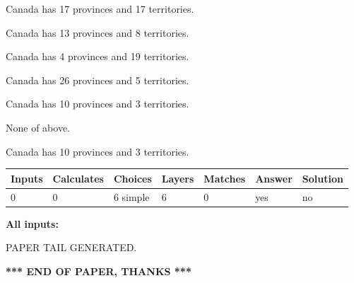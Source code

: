 \documentclass[12pt]{article}
\begin{document}
 
Canada has  17 provinces and  17 territories.
 
 
Canada has  13 provinces and  8 territories.
 
 
Canada has   4 provinces and  19 territories.
 
 
Canada has  26 provinces and  5 territories.
 
 
Canada has 10  provinces and 3 territories.
 
 
 None of above.
 
 
\noindent{}
 
 
Canada has 10  provinces and 3 territories.
 
 
\noindent{}
 
 
   
   
   
   
\noindent\begin{tabular}{|l|l|l|l|l|l|l|}
 \hline
Inputs & Calculates & Choices & Layers & Matches & Answer & Solution \\ \hline
 0  & 
 0  & 
 6
  simple  
  & 
 6  & 
 0  & 
  yes & 
  no 
  \\ \hline
 \end{tabular}
   
   
   
   
\noindent{}
   
   
   
   
\noindent\vspace{0.1in}\hspace{-0.08in} {\textbf{\Large{All inputs: }}}
   
   
   
   
   
   
 \vspace{0.2in}
 
   
   
\vspace{2.0in} PAPER TAIL GENERATED.
   
   
   
   
\vspace{1.0in} 
{\textbf{\large{ *** END OF PAPER, THANKS *** }}} 
   
\end{document}
